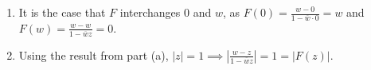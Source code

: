 \documentclass{article}
\begin{document}
\begin{enumerate}
\begin{enumerate}
\begin{enumerate}
\item It is the case that $F$ interchanges 0 and $w$, as $F(0) = \frac{w - 0}{1 - \overline{w} \cdot 0} = w$ and $F(w) = \frac{w - w}{1 - \overline{w}z} = 0$.

\item Using the result from part (a), $|z| = 1 \implies \left|\frac{w-z}{1-\overline{w}z}\right| = 1 = |F(z)|. $
\end{enumerate}

\end{enumerate}


\end{enumerate}
\end{document}
